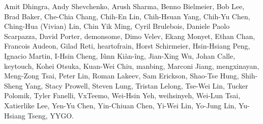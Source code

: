 Amit Dhingra,                  %
Andy Shevchenko,               %
Arush Sharma,                  %
Benno Bielmeier,               %
Bob Lee,                       %
Brad Baker,                    %
Che-Chia Chang,                %
Chih-En Lin,                   %
Chih-Hsuan Yang,               %
Chih-Yu Chen,                  %
Ching-Hua (Vivian) Lin,        %
Chin Yik Ming,                 %
Cyril Brulebois,               %
Daniele Paolo Scarpazza,       %
David Porter,                  %
demonsome,                     %
Dimo Velev,                    %
Ekang Monyet,                  %
Ethan Chan,                    %
Francois Audeon,               %
Gilad Reti,                    %
heartofrain,                   %
Horst Schirmeier,              %
Hsin-Hsiang Peng,              %
Ignacio Martin,                %
I-Hsin Cheng,                  %
Iûnn Kiàn-îng,                 %
Jian-Xing Wu,                  %
Johan Calle,                   %
keytouch,                      %
Kohei Otsuka,                  %
Kuan-Wei Chiu,                 %
manbing,                       %
Marconi Jiang,                 %
mengxinayan,                   %
Meng-Zong Tsai,                %
Peter Lin,                     %
Roman Lakeev,                  %
Sam Erickson,                  %
Shao-Tse Hung,                 %
Shih-Sheng Yang,               %
Stacy Prowell,                 %
Steven Lung,                   %
Tristan Lelong,                %
Tse-Wei Lin,                   %
Tucker Polomik,                %
Tyler Fanelli,                 %
VxTeemo,                       %
Wei-Hsin Yeh,                  %
weihsinyeh,                    %
Wei-Lun Tsai,                  %
Xatierlike Lee,                %
Yen-Yu Chen,                   %
Yin-Chiuan Chen,               %
Yi-Wei Lin,                    %
Yo-Jung Lin,                   %
Yu-Hsiang Tseng,               %
YYGO.                          %
